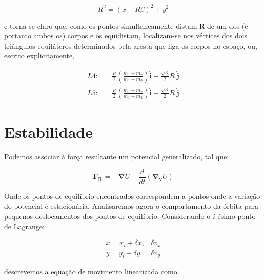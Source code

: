 \begin{equation}
    R^2=(x-R\beta)^2+y^2
\end{equation}

e torna-se claro que, como os pontos simultaneamente distam R de um dos (e portanto ambos os) corpos e os equidistam, localizam-se nos vértices dos dois triângulos equiláteros determinados pela aresta que liga os corpos no espaço, ou, escrito explicitamente,

\begin{align}
    L4: & \quad \frac{R}{2}\left(\frac{m_1 - m_2}{m_1 + m_2}\right)\mathbf{\hat{i}} +\frac{\sqrt{3}}{2}R\;\mathbf{\hat{j}} \\
    L5: & \quad \frac{R}{2}\left(\frac{m_1 - m_2}{m_1 + m_2}\right)\mathbf{\hat{i}}  -\frac{\sqrt{3}}{2}R\;\mathbf{\hat{j}}
\end{align}

\section{Estabilidade}

Podemos associar à força resultante um potencial generalizado, tal que:

\begin{equation}
\mathbf{F_R} = -\boldsymbol{\nabla} U + \frac{d}{dt}(\boldsymbol{\nabla _v}U)
\end{equation}

Onde os pontos de equilíbrio encontrados correspondem a pontos onde a variação do potencial é estacionária. Analisaremos agora o comportamento da órbita para pequenos deslocamentos dos pontos de equilíbrio. Considerando o $i$-ésimo ponto de Lagrange:

\begin{eqnarray}
x = x_i + \delta x, & \delta v_x \\
y = y_i + \delta y, & \delta v_y
\end{eqnarray}

descrevemos a equação de movimento linearizada como


